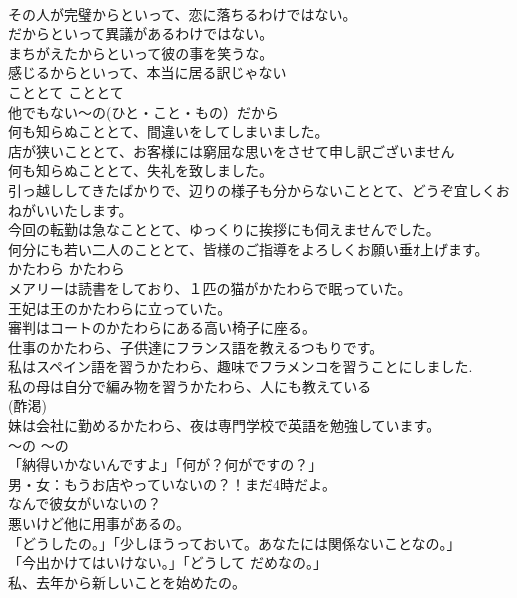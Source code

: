 \documentclass[8pt]{extreport}
\begin{document}
\begin{CJK}{UTF8}{min}
\\	その人が完璧からといって、恋に落ちるわけではない。   
\\	だからといって異議があるわけではない。   
\\	まちがえたからといって彼の事を笑うな。   
\\	感じるからといって、本当に居る訳じゃない  
\\	こととて	こととて	
\\	他でもない〜の(ひと・こと・もの）だから	
\\	何も知らぬこととて、間違いをしてしまいました。  
\\	店が狭いこととて、お客様には窮屈な思いをさせて申し訳ございません  
\\	何も知らぬこととて、失礼を致しました。  
\\	引っ越ししてきたばかりで、辺りの様子も分からないこととて、どうぞ宜しくおねがいいたします。  
\\	今回の転勤は急なこととて、ゆっくりに挨拶にも伺えませんでした。  
\\	何分にも若い二人のこととて、皆様のご指導をよろしくお願い垂ｵ上げます。  
\\	かたわら	かたわら	
\\	メアリーは読書をしており、１匹の猫がかたわらで眠っていた。   
\\	王妃は王のかたわらに立っていた。   
\\	審判はコートのかたわらにある高い椅子に座る。   
\\	仕事のかたわら、子供達にフランス語を教えるつもりです。  
\\	私はスペイン語を習うかたわら、趣味でフラメンコを習うことにしました.   
\\	私の母は自分で編み物を習うかたわら、人にも教えている  
\\	(酢渇)
\\	妹は会社に勤めるかたわら、夜は専門学校で英語を勉強しています。  
\\	〜の	〜の	
\\	「納得いかないんですよ」「何が？何がですの？」  
\\	男・女：もうお店やっていないの？！まだ4時だよ。  
\\	なんで彼女がいないの？  
\\	悪いけど他に用事があるの。  
\\	「どうしたの。」「少しほうっておいて。あなたには関係ないことなの。」  
\\	「今出かけてはいけない。」「どうして だめなの。」  
\\	私、去年から新しいことを始めたの。  

\end{CJK}
\end{document}
